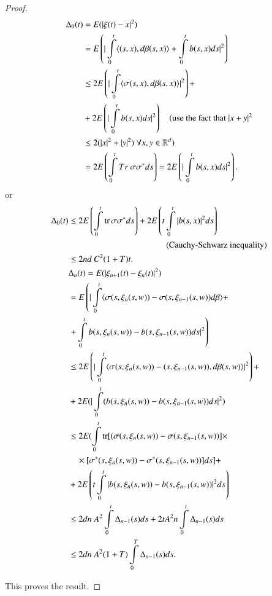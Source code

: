 \begin{proof}
\begin{align*}
\Delta_{0}(t) &= E(|\xi(t)-x|^{2})\\
&= E\left(|\int\limits^{t}_{0}\langle (s,x),d\beta(s,x)\rangle
+\int\limits^{t}_{0}b(s,x)ds|^{2}\right)\\
&\leq 2E\left(|\int\limits^{t}_{0}\langle
\sigma(s,x),d\beta(s,x)\rangle |^{2}\right)+\\
&+2E\left(|\int\limits^{t}_{0}b(s,x)ds|^{2}\right)\q (\text{use the fact
  that~ } |x+y|^{2}\\
&\leq 2(|x|^{2}+|y|^{2})\;\forall x,y\in \mathbb{R}^{d})\\
&=
2E\left(\int\limits^{t}_{0}Tr\ \sigma\sigma^{*}ds\right)=2E\left(|\int\limits^{t}_{0}b(s,x)ds|^{2}\right). 
\end{align*}
or\pageoriginale
\begin{align*}
\Delta_{0}(t) &\leq
2E\left(\int\limits^{t}_{0}\tr\sigma\sigma^{*}ds\right)+2E\left(t\int\limits^{t}_{0}|b(s,x)|^{2}ds\right)\\
&\hspace{4cm} \text{(Cauchy-Schwarz inequality)}\\
&\leq 2nd\ C^{2}(1+T)t.\\
&\Delta_{n}(t)=E(|\xi_{n+1}(t)-\xi_{n}(t)|^{2})\\
&= E\left(|\int\limits^{t}_{0}\langle
\sigma(s,\xi_{n}(s,w))-\sigma(s,\xi_{n-1}(s,w))d\beta\rangle +\right.\\
&\left.+
\int\limits^{t}_{0}b(s,\xi_{n}(s,w))-b(s,\xi_{n-1}(s,w))ds|^{2}\right)\\
&\leq 2E\left(|\int\limits^{t}_{0}\langle
\sigma(s,\xi_{n}(s,w))-(s,\xi_{n-1}(s,w)),d\beta(s,w)\rangle
|^{2}\right)+\\
&+2E(|\int\limits^{t}_{0}(b(s,\xi_{n}(s,w))-b(s,\xi_{n-1}(s,w))ds|^{2})\\
&\leq
2E(\int\limits^{t}_{0}\tr[(\sigma(s,\xi_{n}(s,w))-\sigma(s,\xi_{n-1}(s,w))]\times\\
&\q \times
[\sigma^{*}(s,\xi_{n}(s,w))-\sigma^{*}(s,\xi_{n-1}(s,w))]ds]+\\
&+
  2E\left(t\int\limits^{t}_{0}|b(s,\xi_{n}(s,w))-b(s,\xi_{n-1}(s,w))|^{2}ds\right)\\ 
&\leq
  2dn\ A^{2}\int\limits^{t}_{0}\Delta_{n-1}(s)ds+2tA^{2}n\int\limits^{t}_{0}\Delta_{n-1}(s)ds\\
&\leq 2dn\ A^{2}(1+T)\int\limits^{T}_{0}\Delta_{n-1}(s)ds. 
\end{align*}\pageoriginale

This proves the result.
\end{proof}

